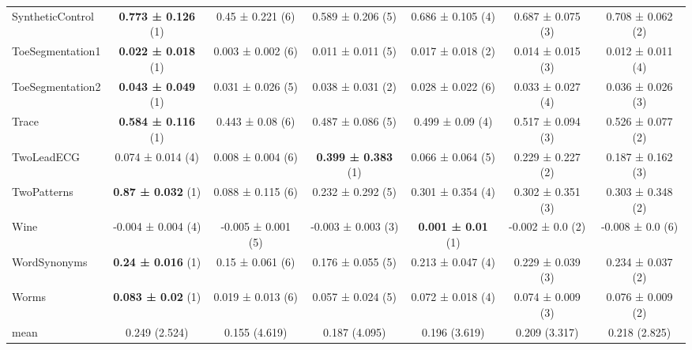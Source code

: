 \begin{table}[ht]
\begin{adjustbox}{width=\textwidth}
\begin{tabular}{lcccccc}
    SyntheticControl & \textbf{0.773 ± 0.126} (1) & 0.45 ± 0.221 (6) & 0.589 ± 0.206 (5) & 0.686 ± 0.105 (4) & 0.687 ± 0.075 (3) & 0.708 ± 0.062 (2) \\
    ToeSegmentation1 & \textbf{0.022 ± 0.018} (1) & 0.003 ± 0.002 (6) & 0.011 ± 0.011 (5) & 0.017 ± 0.018 (2) & 0.014 ± 0.015 (3) & 0.012 ± 0.011 (4) \\
    ToeSegmentation2 & \textbf{0.043 ± 0.049} (1) & 0.031 ± 0.026 (5) & 0.038 ± 0.031 (2) & 0.028 ± 0.022 (6) & 0.033 ± 0.027 (4) & 0.036 ± 0.026 (3) \\
    Trace & \textbf{0.584 ± 0.116} (1) & 0.443 ± 0.08 (6) & 0.487 ± 0.086 (5) & 0.499 ± 0.09 (4) & 0.517 ± 0.094 (3) & 0.526 ± 0.077 (2) \\
    TwoLeadECG & 0.074 ± 0.014 (4) & 0.008 ± 0.004 (6) & \textbf{0.399 ± 0.383} (1) & 0.066 ± 0.064 (5) & 0.229 ± 0.227 (2) & 0.187 ± 0.162 (3) \\
    TwoPatterns & \textbf{0.87 ± 0.032} (1) & 0.088 ± 0.115 (6) & 0.232 ± 0.292 (5) & 0.301 ± 0.354 (4) & 0.302 ± 0.351 (3) & 0.303 ± 0.348 (2) \\
    Wine & -0.004 ± 0.004 (4) & -0.005 ± 0.001 (5) & -0.003 ± 0.003 (3) & \textbf{0.001 ± 0.01} (1) & -0.002 ± 0.0 (2) & -0.008 ± 0.0 (6) \\
    WordSynonyms & \textbf{0.24 ± 0.016} (1) & 0.15 ± 0.061 (6) & 0.176 ± 0.055 (5) & 0.213 ± 0.047 (4) & 0.229 ± 0.039 (3) & 0.234 ± 0.037 (2) \\
    Worms & \textbf{0.083 ± 0.02} (1) & 0.019 ± 0.013 (6) & 0.057 ± 0.024 (5) & 0.072 ± 0.018 (4) & 0.074 ± 0.009 (3) & 0.076 ± 0.009 (2) \\
    \hline 
    mean & 0.249 (2.524) & 0.155 (4.619) & 0.187 (4.095) & 0.196 (3.619) & 0.209 (3.317) & 0.218 (2.825) \\ 
    \hline
    \end{tabular}
    \end{adjustbox}
    \end{table}
    
    


